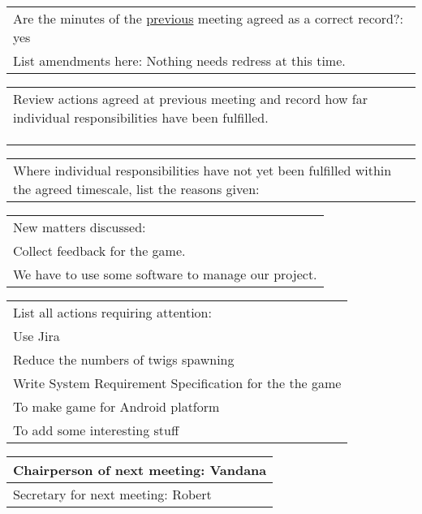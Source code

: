 \documentclass{article}
\begin{document}
\begin{table}[H]
	\centering
	\begin{tabular}{| p{12cm}  |}
	\hline
	Are the minutes of the \underline{previous} meeting agreed as a correct record?: yes \\ 
	List amendments here: Nothing needs redress at this time. \\ \hline
\end{tabular}
\end{table}

\begin{table}[H]
	\centering
	\begin{tabular}{| p{12cm}  |}
	\hline
	Review actions agreed at previous meeting and record how far individual responsibilities have been fulfilled. \\ 
\\
	\\
     \\ \hline
\end{tabular}
\end{table}

\begin{table}[H]
	\centering
	\begin{tabular}{| p{12cm}  |}
	\hline
	Where individual responsibilities have not yet been fulfilled within the agreed timescale, list the reasons given: \\
	
\end{tabular}
\end{table}

\begin{table}[H]
	\centering
	\begin{tabular}{| p{12cm}  |}
	\hline
	New matters discussed: \\ 
	Collect feedback for the game.\\
	We have to use some software to manage our project.
	\hline
\end{tabular}
\end{table}

\begin{table}[H]
	\centering
	\begin{tabular}{| p{12cm}  |}
	\hline
	List all actions requiring attention: \\ 
    Use Jira \\ 
    Reduce the numbers of twigs spawning\\
    Write System Requirement Specification for the the game \\ 
    To make game for Android platform \\
    To add some interesting stuff \\ \hline
\end{tabular}
\end{table}

\begin{table}[H]
	\centering
	\begin{tabular}{| p{12cm}  |}
	\hline
	Chairperson of next meeting: Vandana\\ \hline
	Secretary for next meeting: Robert \\ \hline
\end{tabular}
\end{table}
\end{document}
